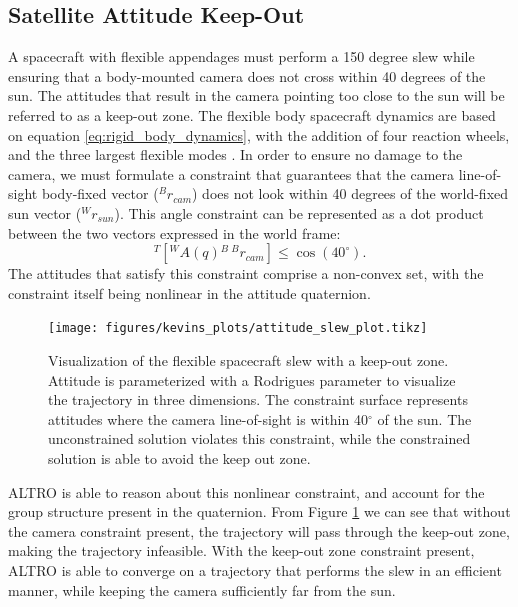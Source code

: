 \documentclass[letterpaper, 10 pt, conference]{ieeeconf}  %
\newcommand{\todo}[1]{\textcolor{red}{TODO: #1}}
\begin{document}
    \subsection{Satellite Attitude Keep-Out}
    A spacecraft with flexible appendages must perform a 150 degree slew while ensuring
    that a body-mounted camera does not cross within 40 degrees of the sun. The
    attitudes that result in the camera pointing too close to the sun will be
    referred to as a keep-out zone. The flexible body spacecraft dynamics are based on equation \eqref{eq:rigid_body_dynamics}, with the addition of four reaction wheels, and the three largest flexible modes \cite{Tracy2020}. In order to ensure no damage to the camera, we must formulate a constraint that guarantees that the camera line-of-sight body-fixed vector ($^Br_{cam}$)
    does not look within 40 degrees of the world-fixed sun vector ($^Wr_{sun}$). This angle constraint can be represented as a dot product between the two vectors expressed in the world frame:
    \begin{equation}
         [{}^W r_{sun}]^T[{}^W A(q) {}^B\, {}^Br_{cam} ] \leq \cos(40 ^\circ).
    \end{equation}
    The attitudes that satisfy this constraint comprise a non-convex set, with the constraint itself being nonlinear in the attitude quaternion. 
        \begin{figure}[H]
            \centering
            \texttt{[image: figures/kevins\_plots/attitude\_slew\_plot.tikz]}
            \caption{Visualization of the flexible spacecraft slew with a keep-out zone. Attitude is parameterized with a Rodrigues parameter to visualize the trajectory in three dimensions. The constraint surface represents attitudes where the camera line-of-sight is within 40$^\circ$ of the sun. The unconstrained solution violates this constraint, while the constrained solution is able to avoid the keep out zone.}
            \label{fig:keepout}
        \end{figure}
ALTRO is able to reason about this nonlinear constraint, and account for the group structure present in the quaternion. From Figure \ref{fig:keepout} we can see that without the camera constraint present, the trajectory will pass through the keep-out zone, making the trajectory infeasible. With the keep-out zone constraint present, ALTRO is able to converge on a trajectory that performs the slew in an efficient manner, while keeping the camera sufficiently far from the sun. 
\end{document}
